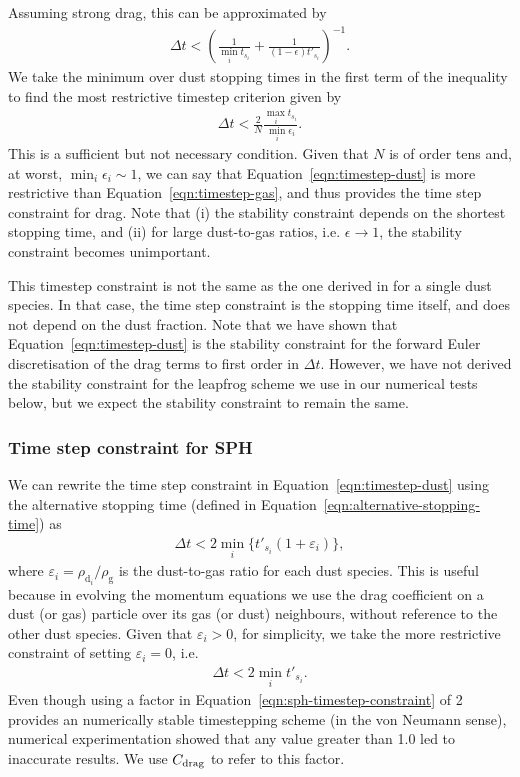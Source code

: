 \documentclass[fleqn,usenatbib]{mnras}
\newcommand{\g}{\mathrm{g}}
\newcommand{\dd}{\mathrm{d}}
\begin{document}
%
Assuming strong drag, this can be approximated by
%
\begin{align}
   \Delta t < \left( \frac{1}{\min_i t_{s_i}}
      + \frac{1}{(1 - \epsilon) t'_{s_i}} \right)^{-1}.
\end{align}
%
We take the minimum over dust stopping times in the first term of the inequality
to find the most restrictive timestep criterion given by
%
\begin{align}
   \label{eqn:timestep-gas}
   \Delta t < \frac{2}{N} \frac{\max_i t_{s_i}}{\min_i \epsilon_i}.
\end{align}
%
This is a sufficient but not necessary condition. Given that \(N\) is of order
tens and, at worst, \(\min_i \epsilon_i \sim 1\), we can say that
Equation~\ref{eqn:timestep-dust} is more restrictive than
Equation~\ref{eqn:timestep-gas}, and thus provides the time step constraint for
drag. Note that (i) the stability constraint depends on the shortest stopping
time, and (ii) for large dust-to-gas ratios, i.e. \(\epsilon \rightarrow 1\),
the stability constraint becomes unimportant.

This timestep constraint is not the same as the one derived in
\citet{Laibe2012MNRAS.420.2345L} for a single dust species. In that case, the
time step constraint is the stopping time itself, and does not depend on the
dust fraction. Note that we have shown that Equation~\ref{eqn:timestep-dust} is
the stability constraint for the forward Euler discretisation of the drag terms
to first order in \(\Delta t\). However, we have not derived the stability
constraint for the leapfrog scheme we use in our numerical tests below, but we
expect the stability constraint to remain the same.

\subsubsection{Time step constraint for SPH}

We can rewrite the time step constraint in Equation~\ref{eqn:timestep-dust}
using the alternative stopping time
(defined in Equation~\ref{eqn:alternative-stopping-time}) as
%
\begin{align}
   \Delta t < 2 \min_i \{t'_{s_i} (1 + \varepsilon_i)\},
\end{align}
%
where \(\varepsilon_i = \rho_{\dd_i} / \rho_{\g}\) is the dust-to-gas ratio for
each dust species. This is useful because in evolving the momentum equations we
use the drag coefficient on a dust (or gas) particle over its gas (or dust)
neighbours, without reference to the other dust species. Given that
\(\varepsilon_i > 0\), for simplicity, we take the more restrictive constraint
of setting \(\varepsilon_i = 0\), i.e.
%
\begin{align}
   \label{eqn:sph-timestep-constraint}
   \Delta t < 2 \min_i t'_{s_i}.
\end{align}
%
Even though using a factor in Equation~\ref{eqn:sph-timestep-constraint} of 2
provides an numerically stable timestepping scheme (in the von Neumann sense),
numerical experimentation showed that any value greater than 1.0 led to
inaccurate results. We use \(C_{\rm drag}\) to refer to this factor.
\end{document}
